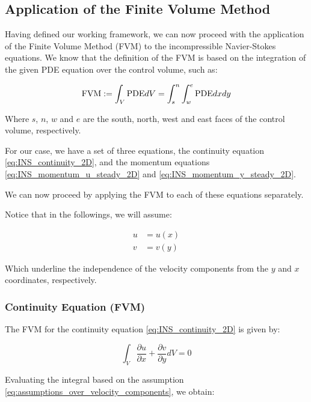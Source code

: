 \subsection{Application of the Finite Volume Method}
\label{subsec:application_of_the_finite_volume_method}

Having defined our working framework, we can now proceed with the application of the Finite Volume Method (FVM) to the incompressible Navier-Stokes equations.
We know that the definition of the FVM is based on the integration of the given PDE equation over the control volume, such as:

\begin{equation}
    \text{FVM}:=\int_{V} \text{PDE} \space dV = \int_{s}^{n} \int_{w}^{e} \text{PDE} \space dxdy
\end{equation}

Where $s$, $n$, $w$ and $e$ are the south, north, west and east faces of the control volume, respectively.

For our case, we have a set of three equations, the continuity equation \ref{eq:INS_continuity_2D}, and the momentum equations \ref{eq:INS_momentum_u_steady_2D} and \ref{eq:INS_momentum_y_steady_2D}.

We can now proceed by applying the FVM to each of these equations separately.

Notice that in the followings, we will assume:

\begin{align}
    u & = u(x) \\
    v & = v(y)
    \label{eq:assumptions_over_velocity_components}
\end{align}

Which underline the independence of the velocity components from the $y$ and $x$ coordinates, respectively.



\subsubsection{Continuity Equation (FVM)}

The FVM for the continuity equation \ref{eq:INS_continuity_2D} is given by:

\begin{equation}
    \int_{V} \frac{\partial u}{\partial x} + \frac{\partial v}{\partial y} dV = 0
    \label{eq:INS_steady_2D_discretized_continuity}
\end{equation}

Evaluating the integral based on the assumption \ref{eq:assumptions_over_velocity_components}, we obtain:

